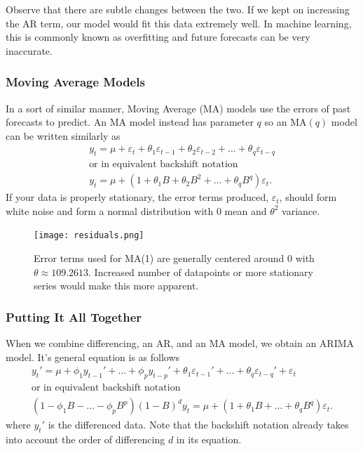 \documentclass{article}
\begin{document}
    Observe that there are subtle changes between the two. If we kept on increasing the AR term, our model would fit this data extremely well. In machine learning, this is commonly known as overfitting and future forecasts can be very inaccurate.

  \subsubsection{Moving Average Models}
    In a sort of similar manner, Moving Average (MA) models use the errors of past forecasts to predict. An MA model instead has parameter $q$ so an MA$(q)$ model can be written similarly as
    \begin{gather*}
      y_t = \mu + \varepsilon_t + \theta_1 \varepsilon_{t-1} + \theta_2 \varepsilon_{t-2} + ... + \theta_q \varepsilon_{t-q}\\
      \text{or in equivalent backshift notation}\\
      y_t = \mu + (1 + \theta_1B + \theta_2B^2 + ... + \theta_qB^q)\varepsilon_t.
    \end{gather*}
    If your data is properly stationary, the error terms produced, $\varepsilon_t$, should form white noise and form a normal distribution with $0$ mean and $\theta^2$ variance.
    
    \begin{figure}[H]
      \centering
      \captionsetup{justification=centering}
      \texttt{[image: residuals.png]}
      \caption{Error terms used for MA(1) are generally centered around 0 with $\theta \approx 109.2613$. Increased number of datapoints or more stationary series would make this more apparent.}
    \end{figure}

  \subsubsection{Putting It All Together}
  When we combine differencing, an AR, and an MA model, we obtain an ARIMA model. It's general equation is as follows
  \begin{gather*}
    y_t' = \mu + \phi_1 y_{t-1}' + ... + \phi_p y_{t-p}' + \theta_1 \varepsilon_{t-1}' + ... + \theta_q \varepsilon_{t-q}' + \varepsilon_t\\
    \text{or in equivalent backshift notation}\\
    (1 - \phi_1B - ... - \phi_pB^p)(1-B)^dy_t = \mu + (1 + \theta_1B + ... + \theta_qB^q)\varepsilon_t.
  \end{gather*}
  where $y_t'$ is the differenced data. Note that the backshift notation already takes into account the order of differencing $d$ in its equation.
\end{document}
